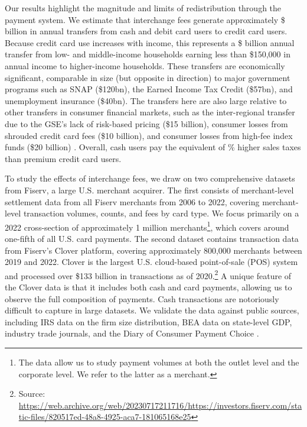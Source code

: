\documentclass[main.tex]{subfiles}
\begin{document}
Our results highlight the magnitude and limits of redistribution through the payment system.
We estimate that interchange fees generate approximately \$ billion in annual transfers from cash and debit card users to credit card users.
Because credit card use increases with income, this represents a \$ billion annual transfer from low- and middle-income households earning less than \$150,000 in annual income to higher-income households.
These transfers are economically significant, comparable in size (but opposite in direction) to major government programs such as SNAP (\$120bn), the Earned Income Tax Credit (\$57bn), and unemployment insurance (\$40bn).
The transfers here are also large relative to other transfers in consumer financial markets, such as the inter-regional transfer due to the GSE's lack of risk-based pricing (\$15 billion), consumer losses from shrouded credit card fees (\$10 billion), and consumer losses from high-fee index funds (\$20 billion) \citep{Hurst.etal2016, agarwal2015regulating, Brown.etal2024}.
Overall, cash users pay the equivalent of \% higher sales taxes than premium credit card users.

To study the effects of interchange fees, we draw on two comprehensive datasets from Fiserv, a large U.S. merchant acquirer.
The first consists of merchant-level settlement data from all Fiserv merchants from 2006 to 2022, covering merchant-level transaction volumes, counts, and fees by card type.
We focus primarily on a 2022 cross-section of approximately 1 million merchants\footnote{The data allow us to study payment volumes at both the outlet level and the corporate level.
We refer to the latter as a merchant.}, which covers around one-fifth of all U.S. card payments.
The second dataset contains transaction data from Fiserv's Clover platform, covering approximately 800,000 merchants between 2019 and 2022.
Clover is the largest U.S. cloud-based point-of-sale (POS) system and processed over \$133 billion in transactions as of 2020.\footnote{Source: \url{https://web.archive.org/web/20230717211716/https://investors.fiserv.com/static-files/820517ed-48a8-4925-aca7-181065168e25}} A unique feature of the Clover data is that it includes both cash and card payments, allowing us to observe the full composition of payments.
Cash transactions are notoriously difficult to capture in large datasets.
We validate the data against public sources, including IRS data on the firm size distribution, BEA data on state-level GDP, industry trade journals, and the Diary of Consumer Payment Choice \citep{Foster.etal2024}.
\end{document}
